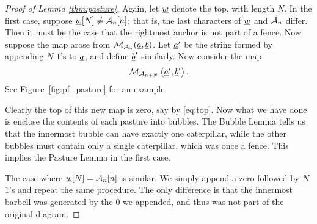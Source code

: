 \pasture*
\begin{proof}[Proof of Lemma \ref{thm:pasture}]
	Again, let $\ul w$ denote the top, with length $N$.  In the first case, suppose $\ul w[N] \neq \AA_n[n]$; that is, the last characters of $\ul w$ and $\AA_n$ differ.  Then it must be the case that the rightmost anchor is not part of a fence.
	Now suppose the map arose from $\MM_{\AA_n}(\ul a, \ul b)$.  Let $\ul a'$ be the string formed by appending $N$ $1$'s to $\ul a$, and define $\ul b'$ similarly.  Now consider the map \[ \MM_{\AA_{n+N}} \left( \ul a', \ul b' \right). \]  See Figure~\ref{fig:pf_pasture} for an example.

	Clearly the top of this new map is zero, say by \eqref{eq:top}.  Now what we have done is enclose the contents of each pasture into bubbles.  The Bubble Lemma tells us that the innermost bubble can have exactly one caterpillar, while the other bubbles must contain only a single caterpillar, which was once a fence.  This implies the Pasture Lemma in the first case.

	The case where $\ul w[N] = \AA_n[n]$ is similar.  We simply append a zero followed by $N$ $1$'s and repeat the same procedure.  The only difference is that the innermost barbell was generated by the $0$ we appended, and thus was not part of the original diagram.
\end{proof}



